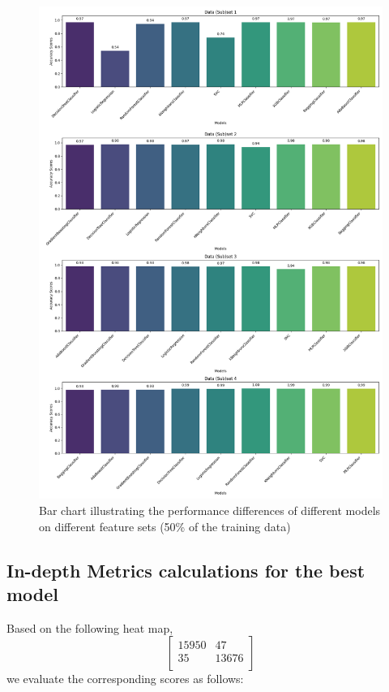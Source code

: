 \begin{figure}[H]
    \centering
    \includegraphics[width=0.8\linewidth]{assets/images/best_classifier/50_data_eval.png}
    \caption{Bar chart illustrating the performance differences of different models on different feature sets (50\% of the training data)}
    \label{fig:eval_bar_scores_50}
\end{figure}

\subsection{In-depth Metrics calculations for the best model}\label{s:calculation}

Based on the following heat map,
\[
\begin{bmatrix}
15950 & 47 \\
35 & 13676 \\
\end{bmatrix}
\]
we evaluate the corresponding scores as follows:

